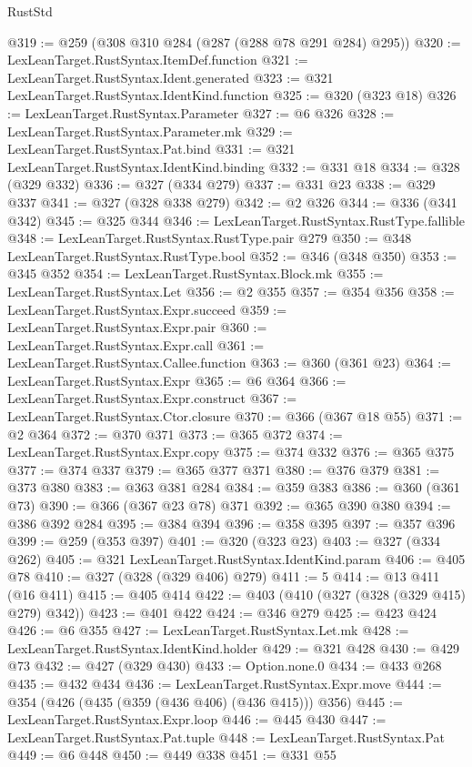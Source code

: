 \begin{lexlean}{RustStd}
\begin{coremodule}
@319 := @259 (@308 @310 @284 (@287 (@288 @78 @291 @284) @295))
@320 := LexLeanTarget.RustSyntax.ItemDef.function
@321 := LexLeanTarget.RustSyntax.Ident.generated
@323 := @321 LexLeanTarget.RustSyntax.IdentKind.function
@325 := @320 (@323 @18)
@326 := LexLeanTarget.RustSyntax.Parameter
@327 := @6 @326
@328 := LexLeanTarget.RustSyntax.Parameter.mk
@329 := LexLeanTarget.RustSyntax.Pat.bind
@331 := @321 LexLeanTarget.RustSyntax.IdentKind.binding
@332 := @331 @18
@334 := @328 (@329 @332)
@336 := @327 (@334 @279)
@337 := @331 @23
@338 := @329 @337
@341 := @327 (@328 @338 @279)
@342 := @2 @326
@344 := @336 (@341 @342)
@345 := @325 @344
@346 := LexLeanTarget.RustSyntax.RustType.fallible
@348 := LexLeanTarget.RustSyntax.RustType.pair @279
@350 := @348 LexLeanTarget.RustSyntax.RustType.bool
@352 := @346 (@348 @350)
@353 := @345 @352
@354 := LexLeanTarget.RustSyntax.Block.mk
@355 := LexLeanTarget.RustSyntax.Let
@356 := @2 @355
@357 := @354 @356
@358 := LexLeanTarget.RustSyntax.Expr.succeed
@359 := LexLeanTarget.RustSyntax.Expr.pair
@360 := LexLeanTarget.RustSyntax.Expr.call
@361 := LexLeanTarget.RustSyntax.Callee.function
@363 := @360 (@361 @23)
@364 := LexLeanTarget.RustSyntax.Expr
@365 := @6 @364
@366 := LexLeanTarget.RustSyntax.Expr.construct
@367 := LexLeanTarget.RustSyntax.Ctor.closure
@370 := @366 (@367 @18 @55)
@371 := @2 @364
@372 := @370 @371
@373 := @365 @372
@374 := LexLeanTarget.RustSyntax.Expr.copy
@375 := @374 @332
@376 := @365 @375
@377 := @374 @337
@379 := @365 @377 @371
@380 := @376 @379
@381 := @373 @380
@383 := @363 @381 @284
@384 := @359 @383
@386 := @360 (@361 @73)
@390 := @366 (@367 @23 @78) @371
@392 := @365 @390 @380
@394 := @386 @392 @284
@395 := @384 @394
@396 := @358 @395
@397 := @357 @396
@399 := @259 (@353 @397)
@401 := @320 (@323 @23)
@403 := @327 (@334 @262)
@405 := @321 LexLeanTarget.RustSyntax.IdentKind.param
@406 := @405 @78
@410 := @327 (@328 (@329 @406) @279)
@411 := 5
@414 := @13 @411 (@16 @411)
@415 := @405 @414
@422 := @403 (@410 (@327 (@328 (@329 @415) @279) @342))
@423 := @401 @422
@424 := @346 @279
@425 := @423 @424
@426 := @6 @355
@427 := LexLeanTarget.RustSyntax.Let.mk
@428 := LexLeanTarget.RustSyntax.IdentKind.holder
@429 := @321 @428
@430 := @429 @73
@432 := @427 (@329 @430)
@433 := Option.none.{0}
@434 := @433 @268
@435 := @432 @434
@436 := LexLeanTarget.RustSyntax.Expr.move
@444 := @354 (@426 (@435 (@359 (@436 @406) (@436 @415))) @356)
@445 := LexLeanTarget.RustSyntax.Expr.loop
@446 := @445 @430
@447 := LexLeanTarget.RustSyntax.Pat.tuple
@448 := LexLeanTarget.RustSyntax.Pat
@449 := @6 @448
@450 := @449 @338
@451 := @331 @55

\end{coremodule}
\end{lexlean}

